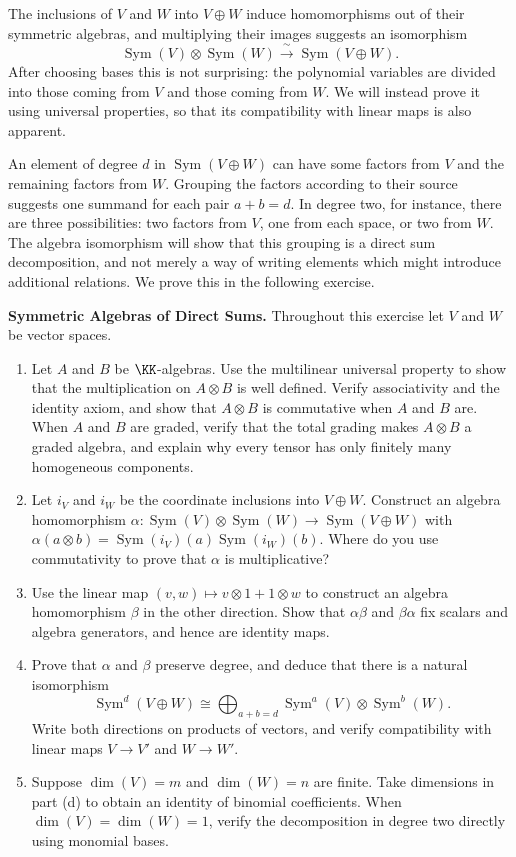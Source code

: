 \documentclass[12pt,reqno]{amsart}
\DeclareMathOperator{\Sym}{Sym}
\begin{document}
The inclusions of $V$ and $W$ into $V\oplus W$ induce homomorphisms out of their symmetric algebras, and multiplying their images suggests an isomorphism
\[
\Sym(V)\otimes\Sym(W)\xrightarrow{\ \sim\ }\Sym(V\oplus W).
\]
After choosing bases this is not surprising: the polynomial variables are divided into those coming from $V$ and those coming from $W$. We will instead prove it using universal properties, so that its compatibility with linear maps is also apparent.

An element of degree $d$ in $\Sym(V\oplus W)$ can have some factors from $V$ and the remaining factors from $W$. Grouping the factors according to their source suggests one summand for each pair $a+b=d$. In degree two, for instance, there are three possibilities: two factors from $V$, one from each space, or two from $W$. The algebra isomorphism will show that this grouping is a direct sum decomposition, and not merely a way of writing elements which might introduce additional relations. We prove this in the following exercise.

\hrulefill

\begin{problems}
\item\label{s:directsum} \textbf{Symmetric Algebras of Direct Sums.} Throughout this exercise let $V$ and $W$ be vector spaces.
\begin{enumerate}
\item Let $A$ and $B$ be $\KK$-algebras. Use the multilinear universal property to show that the multiplication on $A\otimes B$ is well defined. Verify associativity and the identity axiom, and show that $A\otimes B$ is commutative when $A$ and $B$ are. When $A$ and $B$ are graded, verify that the total grading makes $A\otimes B$ a graded algebra, and explain why every tensor has only finitely many homogeneous components.
\item Let $i_V$ and $i_W$ be the coordinate inclusions into $V\oplus W$. Construct an algebra homomorphism $\alpha:\Sym(V)\otimes\Sym(W)\to\Sym(V\oplus W)$ with $\alpha(a\otimes b)=\Sym(i_V)(a)\Sym(i_W)(b)$. Where do you use commutativity to prove that $\alpha$ is multiplicative?
\item Use the linear map $(v,w)\mapsto v\otimes1+1\otimes w$ to construct an algebra homomorphism $\beta$ in the other direction. Show that $\alpha\beta$ and $\beta\alpha$ fix scalars and algebra generators, and hence are identity maps.
\item Prove that $\alpha$ and $\beta$ preserve degree, and deduce that there is a natural isomorphism
\[
\Sym^d(V\oplus W)\cong\bigoplus_{a+b=d}\Sym^a(V)\otimes\Sym^b(W).
\]
Write both directions on products of vectors, and verify compatibility with linear maps $V\to V'$ and $W\to W'$.
\item Suppose $\dim(V)=m$ and $\dim(W)=n$ are finite. Take dimensions in part (d) to obtain an identity of binomial coefficients. When $\dim(V)=\dim(W)=1$, verify the decomposition in degree two directly using monomial bases.
\end{enumerate}
\end{problems}
\end{document}
